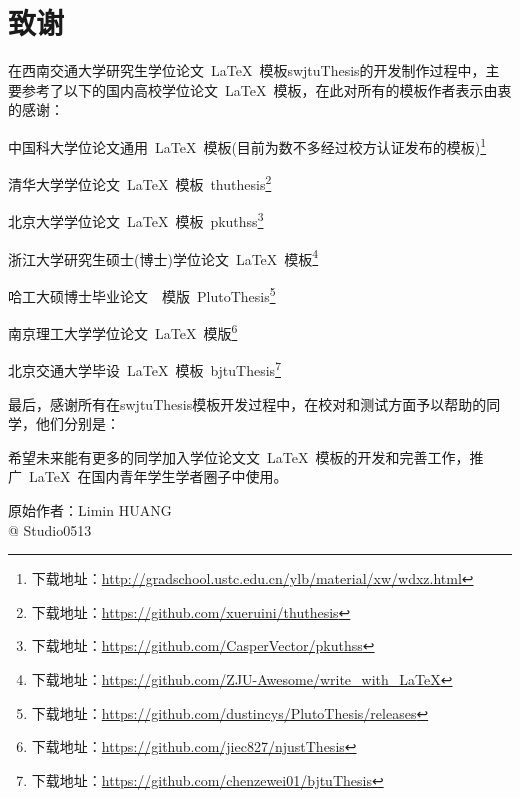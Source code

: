 \chapter*{致\qquad{}谢}

在西南交通大学研究生学位论文~\LaTeX{}~模板swjtuThesis的开发制作过程中，主要参考了以下的国内高校学位论文~\LaTeX{}~模板，在此对所有的模板作者表示由衷的感谢：
\begin{compactitem}
	\item 中国科大学位论文通用~\LaTeX{}~模板(目前为数不多经过校方认证发布的模板)\footnote{下载地址：\url{http://gradschool.ustc.edu.cn/ylb/material/xw/wdxz.html}}
	\item 清华大学学位论文~\LaTeX{}~模板~thuthesis\footnote{下载地址：\url{https://github.com/xueruini/thuthesis}}
	\item 北京大学学位论文~\LaTeX{}~模板~pkuthss\footnote{下载地址：\url{https://github.com/CasperVector/pkuthss}}
	\item 浙江大学研究生硕士(博士)学位论文~\LaTeX{}~模板\footnote{下载地址：\url{https://github.com/ZJU-Awesome/write_with_LaTeX}}
	\item 哈工大硕博士毕业论文~\XeLaTeX{}~模版~PlutoThesis\footnote{下载地址：\url{https://github.com/dustincys/PlutoThesis/releases}}
	\item 南京理工大学学位论文~\LaTeX{}~模版\footnote{下载地址：\url{https://github.com/jiec827/njustThesis}}
	\item 北京交通大学毕设~\LaTeX{}~模板~bjtuThesis\footnote{下载地址：\url{https://github.com/chenzewei01/bjtuThesis}}
\end{compactitem}

\par
最后，感谢所有在swjtuThesis模板开发过程中，在校对和测试方面予以帮助的同学，他们分别是：

\par
希望未来能有更多的同学加入学位论文文~\LaTeX{}~模板的开发和完善工作，推广~\LaTeX{}~在国内青年学生学者圈子中使用。

\vspace{25mm}
\begin{flushright}
	原始作者：Limin HUANG \\
	@ Studio0513
\end{flushright}